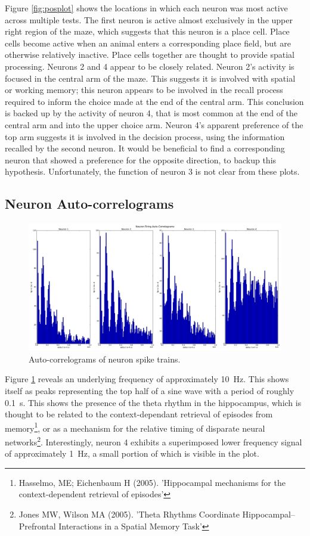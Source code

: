 \documentclass[a4paper, 10pt]{article}
\begin{document}
Figure \ref{fig:posplot} shows the locations in which each neuron was most
active across multiple tests. The first neuron is active almost exclusively in
the upper right region of the maze, which suggests that this neuron is a place
cell. Place cells become active when an animal enters a corresponding place
field, but are otherwise relatively inactive. Place cells together are thought
to provide spatial processing. Neurons 2 and 4 appear to be closely
related. Neuron 2's activity is focused in the central arm of the maze. This
suggests it is involved with spatial or working memory; this neuron appears to
be involved in the recall process required to inform the choice made at the end
of the central arm. This conclusion is backed up by the activity of neuron 4,
that is most common at the end of the central arm and into the upper choice
arm. Neuron 4's apparent preference of the top arm suggests it is involved in
the decision process, using the information recalled by the second neuron. It
would be beneficial to find a corresponding neuron that showed a preference for
the opposite direction, to backup this hypothesis. Unfortunately, the function
of neuron 3 is not clear from these plots.

\subsection*{Neuron Auto-correlograms}
\begin{figure}[H]
  \centering
  \includegraphics[width=1.0\textwidth]{neuron_acorr_plot.png}
  \caption{Auto-correlograms of neuron spike trains.}
  \label{fig:acorr}
\end{figure}

Figure \ref{fig:acorr} reveals an underlying frequency of approximately
\SI{10}{\hertz}. This shows itself as peaks representing the top half of a sine
wave with a period of roughly \SI{0.1}{\second}. This shows the presence of the
theta rhythm in the hippocampus, which is thought to be related to the
context-dependant retrieval of episodes from memory\footnote{Hasselmo, ME;
  Eichenbaum H (2005). 'Hippocampal mechanisms for the context-dependent
  retrieval of episodes'}, or as a mechanism for the relative timing of
disparate neural networks\footnote{Jones MW, Wilson MA (2005). 'Theta Rhythms
  Coordinate Hippocampal–Prefrontal Interactions in a Spatial Memory
  Task'}. Interestingly, neuron 4 exhibits a superimposed lower frequency signal
of approximately \SI{1}{\hertz}, a small portion of which is visible in the
plot.
\end{document}
